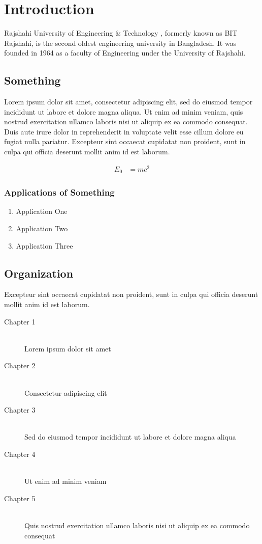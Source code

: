 \documentclass[document.tex]{subfiles}
\begin{document}
\chapter{Introduction}
\noindent Rajshahi University of Engineering \& Technology \cite{ruetwebsite}, formerly known as BIT Rajshahi, is the second oldest engineering university in Bangladesh. It was founded in 1964 as a faculty of Engineering under the University of Rajshahi.

\section{Something}
\noindent Lorem ipsum \cite{awesome2016} dolor sit amet, consectetur adipiscing elit, sed do eiusmod tempor incididunt ut labore et dolore magna aliqua. Ut enim ad minim veniam, quis nostrud exercitation ullamco laboris nisi ut aliquip ex ea commodo consequat. Duis aute irure dolor in reprehenderit in voluptate velit esse cillum dolore eu fugiat nulla pariatur. Excepteur sint occaecat cupidatat non proident, sunt in culpa qui officia deserunt mollit anim id est laborum.

\begin{align}
E_0 &= mc^2
\end{align}

\subsection{Applications of Something}

\begin{enumerate}
        \item Application One
        \item Application Two
        \item Application Three
\end{enumerate}

\section{Organization}
Excepteur sint occaecat cupidatat non proident, sunt in culpa qui officia deserunt mollit anim id est laborum.

\begin{description}
        \item[Chapter 1] \hfill \\
        Lorem ipsum dolor sit amet
        \item[Chapter 2] \hfill \\
        Consectetur adipiscing elit
        \item[Chapter 3] \hfill \\
        Sed do eiusmod tempor incididunt ut labore et dolore magna aliqua
        \item[Chapter 4] \hfill \\
        Ut enim ad minim veniam
        \item[Chapter 5] \hfill \\
        Quis nostrud exercitation ullamco laboris nisi ut aliquip ex ea commodo consequat
\end{description}
\end{document}
